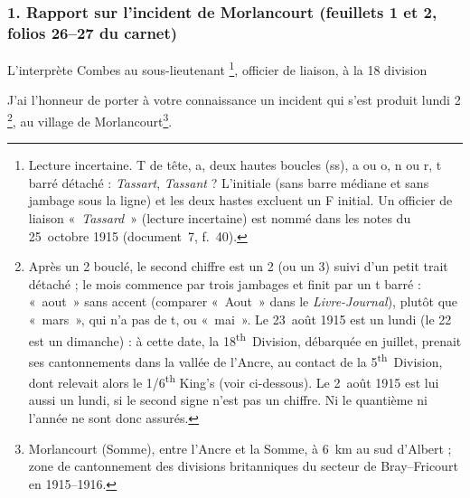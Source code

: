 \subsubsection*{1. Rapport sur l'incident de Morlancourt (feuillets 1 et 2, folios 26--27 du carnet)}

\begin{LJlettre}
 \par\nopagebreak[4]

L'interprète Combes au sous-lieutenant \footnote{Lecture incertaine. T de tête, a, deux hautes boucles (ss), a ou o, n ou r, t barré détaché : \textit{Tassart}, \textit{Tassant} ? L'initiale (sans barre médiane et sans jambage sous la ligne) et les deux hastes excluent un F initial. Un officier de liaison «~\textit{Tassard}~» (lecture incertaine) est nommé dans les notes du 25~octobre 1915 (document~7, f.~40).}, officier de liaison, à la 18 division

J'ai l'honneur de porter à votre connaissance un incident qui s'est produit lundi 2 \footnote{Après un 2 bouclé, le second chiffre est un 2 (ou un 3) suivi d'un petit trait détaché ; le mois commence par trois jambages et finit par un t barré : «~aout~» sans accent (comparer «~Aout~» dans le \textit{Livre-Journal}), plutôt que «~mars~», qui n'a pas de t, ou «~mai~». Le 23~août 1915 est un lundi (le 22 est un dimanche) : à cette date, la 18\textsuperscript{th}~Division, débarquée en juillet, prenait ses cantonnements dans la vallée de l'Ancre, au contact de la 5\textsuperscript{th}~Division, dont relevait alors le 1/6\textsuperscript{th} King's (voir ci-dessous). Le 2~août 1915 est lui aussi un lundi, si le second signe n'est pas un chiffre. Ni le quantième ni l'année ne sont donc assurés.}, au village de Morlancourt\footnote{Morlancourt (Somme), entre l'Ancre et la Somme, à 6~km au sud d'Albert ; zone de cantonnement des divisions britanniques du secteur de Bray--Fricourt en 1915--1916.}.


\end{LJlettre}
